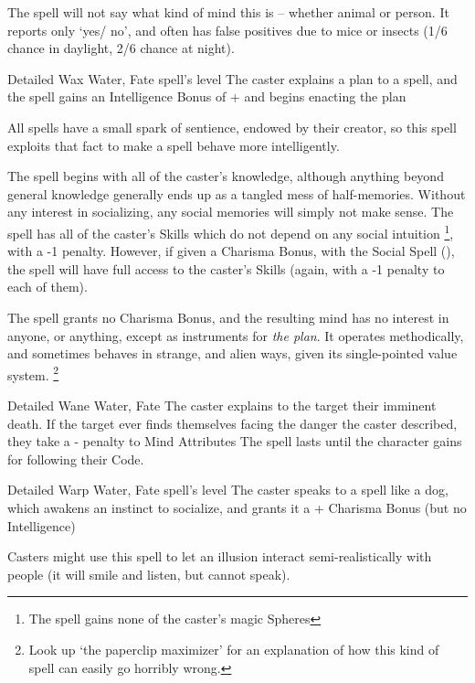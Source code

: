 \begin{multicols}{2}
{    The spell will not say what kind of mind this is -- whether animal or person.
    It reports only `yes/ no', and often has false positives due to mice or insects (1/6 chance in daylight, 2/6 chance at night).}


  {Detailed}%
  {Wax}%
  {Water, Fate}%
  {spell's level}%
  {The caster explains a plan to a spell, and the spell gains an Intelligence Bonus of + and begins enacting the plan}%
  {
  All spells have a small spark of sentience, endowed by their creator, so this spell exploits that fact to make a spell behave more intelligently.

  The spell begins with all of the caster's knowledge, although anything beyond general knowledge generally ends up as a tangled mess of half-memories.
  Without any interest in socializing, any social memories will simply not make sense.
  The spell has all of the caster's Skills which do not depend on any social intuition%
  \footnote{The spell gains none of the caster's magic Spheres},
  with a -1 penalty.
  However, if given a Charisma Bonus, with the Social Spell (), the spell will have full access to the caster's Skills (again, with a -1 penalty to each of them).

  The spell grants no Charisma Bonus, and the resulting mind has no interest in anyone, or anything, except as instruments for \emph{the plan}.
  It operates methodically, and sometimes behaves in strange, and alien ways, given its single-pointed value system.%
  \footnote{Look up `the paperclip maximizer' for an explanation of how this kind of spell can easily go horribly wrong.}
  }

  {Detailed}%
  {Wane}%
  {Water, Fate}%
  {}%
  {The caster explains to the target their imminent death.
    If the target ever finds themselves facing the danger the caster described, they take a - penalty to Mind Attributes}%
  {The spell lasts until the character gains  for following their Code.}




  {Detailed}%
  {Warp}%
  {Water, Fate}%
  {spell's level}%
  {The caster speaks to a spell like a dog, which awakens an instinct to socialize, and grants it a + Charisma Bonus (but no Intelligence)}%
  {
  Casters might use this spell to let an illusion interact semi-realistically with people (it will smile and listen, but cannot speak).

}
\end{multicols}
